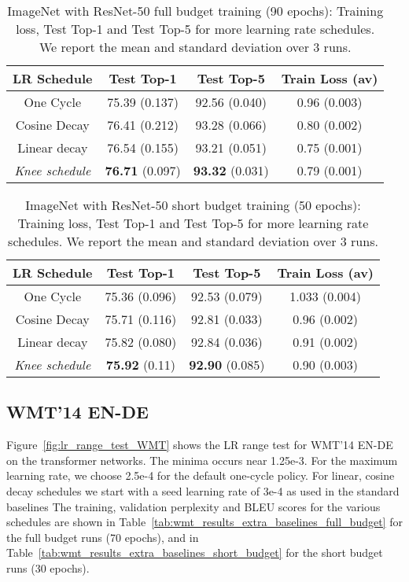 \documentclass{article} \usepackage{iclr2021_conference,times}
\newcommand{\lrschedule}{\textit{Knee schedule}}
\begin{document}
\begin{table}[h]
\small
\centering
\caption{ImageNet with ResNet-50 full budget training (90 epochs): Training loss, Test Top-1 and Test Top-5 for more learning rate schedules. We report the mean and standard deviation over 3 runs.}
\label{tab:ImageNet_full_budget_runs}
\begin{tabular}{cccc}
  \toprule
  LR Schedule    & Test Top-1  & Test Top-5  & Train Loss (av) \\ 
  \midrule
  One Cycle        & 75.39 (0.137) & 92.56 (0.040) & 0.96 (0.003) \\
  Cosine Decay      & 76.41 (0.212) & 93.28 (0.066) & 0.80 (0.002) \\
  Linear decay     &  76.54 (0.155) & 93.21 (0.051)  & 0.75 (0.001)\\
  \lrschedule{}     & \textbf{76.71} (0.097)  & \textbf{93.32} (0.031) & 0.79 (0.001) \\ \bottomrule
\end{tabular}

\end{table}
\begin{table}[h!]
\small
\centering
\caption{ImageNet with ResNet-50 short budget training (50 epochs): Training loss, Test Top-1 and Test Top-5 for more learning rate schedules. We report the mean and standard deviation over 3 runs.}
\label{tab:ImageNet_short_budget_runs}
\begin{tabular}{cccc}
  \toprule
  LR Schedule    & Test Top-1  & Test Top-5  & Train Loss (av) \\ 
  \midrule
  One Cycle        & 75.36 (0.096) & 92.53 (0.079) & 1.033 (0.004)\\
  Cosine Decay     & 75.71 (0.116) & 92.81 (0.033) & 0.96 (0.002) \\
  Linear decay     & 75.82 (0.080) & 92.84 (0.036) & 0.91 (0.002) \\
  \lrschedule{}    & \textbf{75.92} (0.11) & \textbf{92.90} (0.085) & 0.90 (0.003) \\
  \bottomrule
\end{tabular}

\end{table}



\subsection{WMT'14 EN-DE}
Figure~\ref{fig:lr_range_test_WMT} shows the LR range test for WMT'14 EN-DE on the transformer networks. The minima occurs near 1.25e-3. For the maximum learning rate, we choose 2.5e-4 for the default one-cycle policy. For linear, cosine decay schedules we start with a seed learning rate of 3e-4 as used in the standard baselines The training, validation perplexity and BLEU scores for the various schedules are shown in Table~\ref{tab:wmt_results_extra_baselines_full_budget} for the full budget runs (70 epochs), and in Table~\ref{tab:wmt_results_extra_baselines_short_budget} for the short budget runs (30 epochs).
\end{document}
